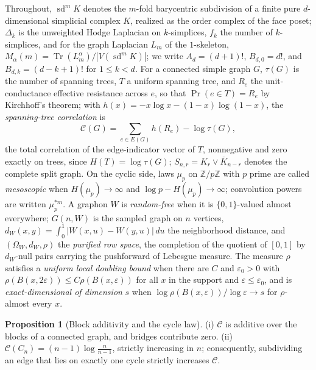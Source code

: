 \documentclass[11pt]{article}
\theoremstyle{definition}
\newtheorem{proposition}{Proposition}
\begin{document}
Throughout, $\operatorname{sd}^mK$ denotes the $m$-fold barycentric subdivision of a finite pure $d$-dimensional simplicial complex $K$, realized as the order complex of the face poset; $\Delta_k$ is the unweighted Hodge Laplacian on $k$-simplices, $f_k$ the number of $k$-simplices, and for the graph Laplacian $L_m$ of the $1$-skeleton, $M_\alpha(m)=\operatorname{Tr}(L_m^\alpha)/|V(\operatorname{sd}^mK)|$; we write $A_d=(d+1)!$, $B_{d,0}=d!$, and $B_{d,k}=(d-k+1)!$ for $1\le k<d$.  For a connected simple graph $G$, $\tau(G)$ is the number of spanning trees, $T$ a uniform spanning tree, and $R_e$ the unit-conductance effective resistance across $e$, so that $\Pr(e\in T)=R_e$ by Kirchhoff's theorem; with $h(x)=-x\log x-(1-x)\log(1-x)$, the \emph{spanning-tree correlation} is
\[
\mathcal C(G)=\sum_{e\in E(G)}h(R_e)-\log\tau(G),
\]
the total correlation of the edge-indicator vector of $T$, nonnegative and zero exactly on trees, since $H(T)=\log\tau(G)$; $S_{n,r}=K_r\vee\overline{K}_{n-r}$ denotes the complete split graph.  On the cyclic side, laws $\mu_p$ on $\mathbb Z/p\mathbb Z$ with $p$ prime are called \emph{mesoscopic} when $H(\mu_p)\to\infty$ and $\log p-H(\mu_p)\to\infty$; convolution powers are written $\mu_p^{*m}$.  A graphon $W$ is \emph{random-free} when it is $\{0,1\}$-valued almost everywhere; $G(n,W)$ is the sampled graph on $n$ vertices, $d_W(x,y)=\int_0^1|W(x,u)-W(y,u)|\,du$ the neighborhood distance, and $(\Omega_W,d_W,\rho)$ the \emph{purified row space}, the completion of the quotient of $[0,1]$ by $d_W$-null pairs carrying the pushforward of Lebesgue measure.  The measure $\rho$ satisfies a \emph{uniform local doubling bound} when there are $C$ and $\varepsilon_0>0$ with $\rho(B(x,2\varepsilon))\le C\rho(B(x,\varepsilon))$ for all $x$ in the support and $\varepsilon\le\varepsilon_0$, and is \emph{exact-dimensional of dimension} $s$ when $\log\rho(B(x,\varepsilon))/\log\varepsilon\to s$ for $\rho$-almost every $x$.

\begin{proposition}[Block additivity and the cycle law]\label{ac:ust}
(i) $\mathcal C$ is additive over the blocks of a connected graph, and bridges contribute zero.  (ii) $\mathcal C(C_n)=(n-1)\log\frac n{n-1}$, strictly increasing in $n$; consequently, subdividing an edge that lies on exactly one cycle strictly increases $\mathcal C$.
\end{proposition}
\end{document}
